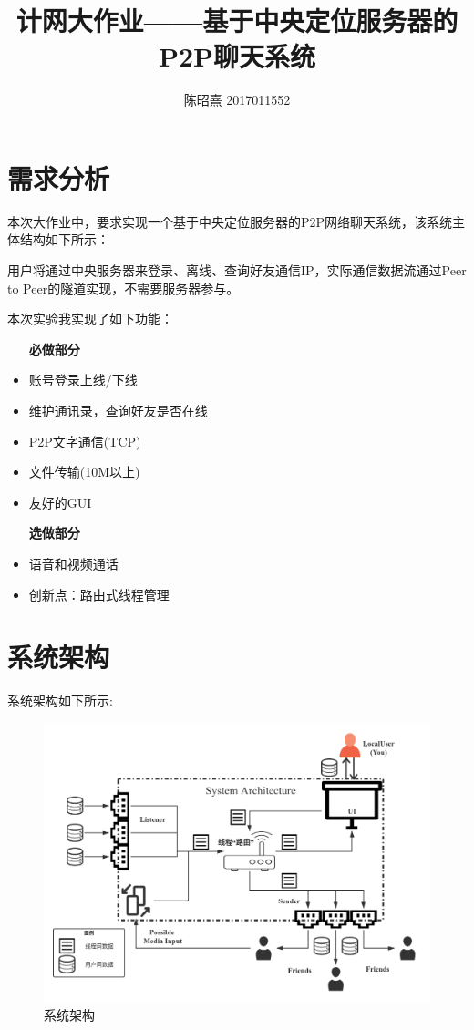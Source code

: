 \documentclass[UTF8]{ctexart}
\begin{document}
\title{计网大作业——基于中央定位服务器的P2P聊天系统}
\author{陈昭熹 2017011552}
\maketitle
\tableofcontents
\newpage

\section{需求分析}
本次大作业中，要求实现一个基于中央定位服务器的P2P网络聊天系统，该系统主体结构如下所示：

用户将通过中央服务器来登录、离线、查询好友通信IP，实际通信数据流通过Peer to Peer的隧道实现，不需要服务器参与。

本次实验我实现了如下功能：
\begin{itemize}
    \item[\textbf{必做部分}] 
    \item 账号登录上线/下线
    \item 维护通讯录，查询好友是否在线
    \item P2P文字通信(TCP)
    \item 文件传输(10M以上)
    \item 友好的GUI
    \item[\textbf{选做部分}]
    \item 语音和视频通话
    \item 创新点：路由式线程管理 
\end{itemize}

\section{系统架构}\label{arch}
系统架构如下所示:
\begin{figure}[H]
    \centering
    \includegraphics[scale=0.33]{myqq.png}
    \caption{系统架构}
\end{figure}
\end{document}
